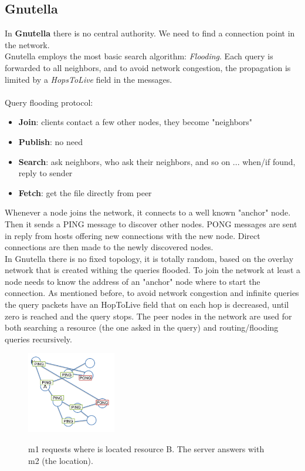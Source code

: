 \documentclass[10pt,a4paper]{article}
\begin{document}
\subsection{Gnutella}
In \textbf{Gnutella} there is no central authority. We need to find a connection point in the network. \\
Gnutella employs the most basic search algorithm: \textit{Flooding}. Each query is forwarded to all neighbors, and to avoid network congestion, the propagation is limited by a \textit{HopsToLive} field in the messages. \\ \\
Query flooding protocol:
\begin{itemize}
	\item \textbf{Join}: clients contact a few other nodes, they become "neighbors"
	\item \textbf{Publish}: no need
	\item \textbf{Search}: ask neighbors, who ask their neighbors, and so on ... when/if found, reply to sender
	\item \textbf{Fetch}: get the file directly from peer
\end{itemize}
Whenever a node joins the network, it connects to a well known "anchor" node. Then it sends a PING message to discover other nodes. PONG messages are sent in reply from hosts offering new connections with the new node. Direct connections are then made to the newly discovered nodes. \\
In Gnutella there is no fixed topology, it is totally random, based on the overlay network that is created withing the queries flooded. To join the network at least a node needs to know the address of an "anchor" node where to start the connection. As mentioned before, to avoid network congestion and infinite queries the query packets have an HopToLive field that on each hop is decreased, until zero is reached and the query stops. The peer nodes in the network are used for both searching a resource (the one asked in the query) and routing/flooding queries recursively.
\begin{figure}[h!]
\hfill \includegraphics[width=110pt]{images/gnutella.png}\hspace*{\fill}
  \label{fig:gnutella}
  \caption{m1 requests where is located resource B. The server answers with m2 (the location). }
\end{figure} \\
\end{document}
